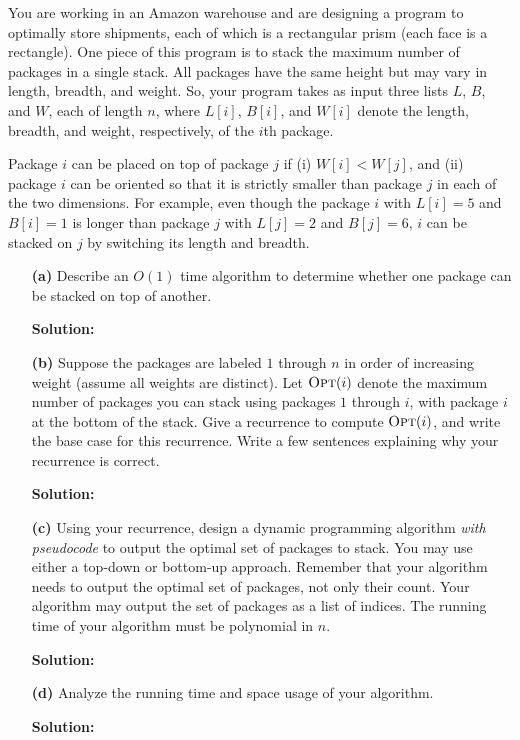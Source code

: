 \documentclass[11pt]{article}
\theoremstyle{definition}
\theoremstyle{theorem}
\newcommand{\opt}{\mbox{{\sc Opt}}}
\newcommand{\solution}[1]{{\medskip\noindent\color{DarkBlue}\textbf{Solution:} {#1}}}
\newcommand{\solution}[1]{}
\begin{document}
You are working in an Amazon warehouse and are designing a program to
optimally store shipments, each of which is a rectangular prism (each
face is a rectangle).  One piece of this program is to stack the
maximum number of packages in a single stack.  All packages have the
same height but may vary in length, breadth, and weight.  So, your
program takes as input three lists $L$, $B$, and $W$, each of length
$n$, where $L[i]$, $B[i]$, and $W[i]$ denote the length, breadth, and
weight, respectively, of the $i$th package.

Package $i$ can be placed on top of package $j$ if (i) $W[i] <
W[j]$, and (ii) package $i$ can be oriented so that it is strictly
smaller than package $j$ in each of the two dimensions.  For example,
even though the package $i$ with $L[i] = 5$ and $B[i] = 1$ is longer
than package $j$ with $L[j] = 2$ and $B[j] = 6$, $i$ can be stacked on
$j$ by switching its length and breadth.

\begin{itemize}
	\item[{\bf (a)}] Describe an $O(1)$ time algorithm to determine
	whether one package can be stacked on top of another.
	
	\solution{
	}
	
	\item[{\bf (b)}] Suppose the packages are labeled $1$ through $n$ in
	order of increasing weight (assume all weights are distinct).  Let
	$\opt(i)$ denote the maximum number of packages you can stack using
	packages $1$ through $i$, with package $i$ at the bottom of the
	stack.  Give a recurrence to compute $\opt(i)$, and write the base
	case for this recurrence.  Write a few sentences explaining why your
	recurrence is correct.
	
	\solution{
	}

	\item[{\bf (c)}] Using your recurrence, design a dynamic programming
	algorithm {\em with pseudocode} to output the optimal set of packages to stack.  You may
	use either a top-down or bottom-up approach.  Remember that your
	algorithm needs to output the optimal set of packages, not only
	their count.  Your algorithm may output the set of packages as a
	list of indices.  The running time of your algorithm must be
	polynomial in $n$.
	
	\solution{
	}
	
	\item[{\bf (d)}]
	Analyze the running time and space usage of your algorithm.
	
	\solution{
	}
\end{itemize}
\end{document}
